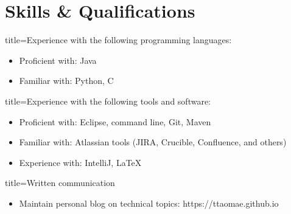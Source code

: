 \documentclass{resume}
\begin{document}
\section*{Skills \& Qualifications}
\begin{skill}{title=Experience with the following programming languages:}
    \begin{itemize}
        \item{Proficient with: Java}
        \item{Familiar with: Python, C}
    \end{itemize}
\end{skill}

\begin{skill}{title=Experience with the following tools and software:}
    \begin{itemize}
        \item{Proficient with: Eclipse, command line, Git, Maven}
        \item{Familiar with: Atlassian tools (JIRA, Crucible, Confluence, and others)}
        \item{Experience with: IntelliJ, \LaTeX}
    \end{itemize}
\end{skill}

\begin{skill}{title=Written communication}
    \begin{itemize}
        \item{Maintain personal blog on technical topics: https://ttaomae.github.io}
    \end{itemize}
\end{skill}
\end{document}

